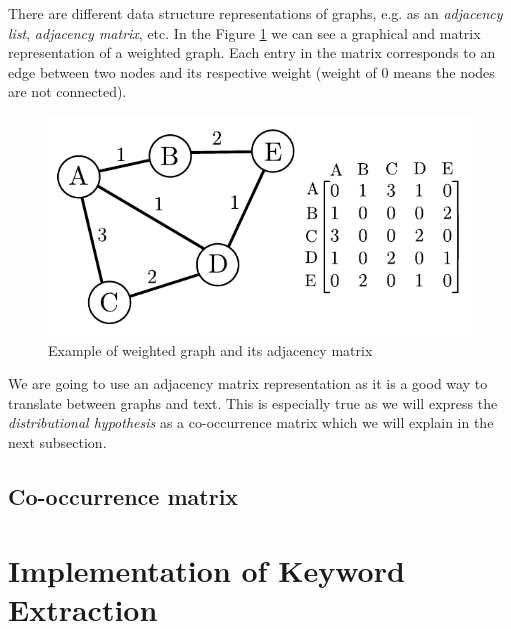 \documentclass[12pt]{article}
\numberwithin{equation}{section}
\begin{document}
\begin{spacing}{1.5}
	There are different data structure representations of graphs, e.g. as an \textit{adjacency list}, \textit{adjacency matrix}, etc. In the Figure \ref{graph_adjacency} we can see a graphical and matrix representation of a weighted graph. Each entry in the matrix corresponds to an edge between two nodes and its respective weight (weight of $0$ means the nodes are not connected).
	
	\begin{figure}[H]
		\centering
		\includegraphics[scale=1.0]{graph_adjacency}		
		\caption{Example of weighted graph and its adjacency matrix}
		\label{graph_adjacency}
	\end{figure}

	We are going to use an adjacency matrix representation as it is a good way to translate between graphs and text. This is especially true as we will express the \textit{distributional hypothesis} as a co-occurrence matrix which we will explain in the next subsection. 
	\subsection{Co-occurrence matrix}


	\newpage
	\section{Implementation of Keyword Extraction}
	

\end{spacing}
\end{document}
